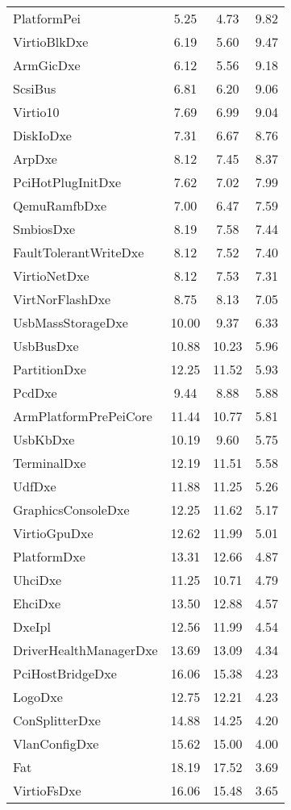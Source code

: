 \begin{longtable}{l c c c}
  PlatformPei & 5.25 & 4.73 & 9.82\\
  VirtioBlkDxe & 6.19 & 5.60 & 9.47\\
  ArmGicDxe & 6.12 & 5.56 & 9.18\\
  ScsiBus & 6.81 & 6.20 & 9.06\\
  Virtio10 & 7.69 & 6.99 & 9.04\\
  DiskIoDxe & 7.31 & 6.67 & 8.76\\
  ArpDxe & 8.12 & 7.45 & 8.37\\
  PciHotPlugInitDxe & 7.62 & 7.02 & 7.99\\
  QemuRamfbDxe & 7.00 & 6.47 & 7.59\\
  SmbiosDxe & 8.19 & 7.58 & 7.44\\
  FaultTolerantWriteDxe & 8.12 & 7.52 & 7.40\\
  VirtioNetDxe & 8.12 & 7.53 & 7.31\\
  VirtNorFlashDxe & 8.75 & 8.13 & 7.05\\
  UsbMassStorageDxe & 10.00 & 9.37 & 6.33\\
  UsbBusDxe & 10.88 & 10.23 & 5.96\\
  PartitionDxe & 12.25 & 11.52 & 5.93\\
  PcdDxe & 9.44 & 8.88 & 5.88\\
  ArmPlatformPrePeiCore & 11.44 & 10.77 & 5.81\\
  UsbKbDxe & 10.19 & 9.60 & 5.75\\
  TerminalDxe & 12.19 & 11.51 & 5.58\\
  UdfDxe & 11.88 & 11.25 & 5.26\\
  GraphicsConsoleDxe & 12.25 & 11.62 & 5.17\\
  VirtioGpuDxe & 12.62 & 11.99 & 5.01\\
  PlatformDxe & 13.31 & 12.66 & 4.87\\
  UhciDxe & 11.25 & 10.71 & 4.79\\
  EhciDxe & 13.50 & 12.88 & 4.57\\
  DxeIpl & 12.56 & 11.99 & 4.54\\
  DriverHealthManagerDxe & 13.69 & 13.09 & 4.34\\
  PciHostBridgeDxe & 16.06 & 15.38 & 4.23\\
  LogoDxe & 12.75 & 12.21 & 4.23\\
  ConSplitterDxe & 14.88 & 14.25 & 4.20\\
  VlanConfigDxe & 15.62 & 15.00 & 4.00\\
  Fat & 18.19 & 17.52 & 3.69\\
  VirtioFsDxe & 16.06 & 15.48 & 3.65\\

\end{longtable}
